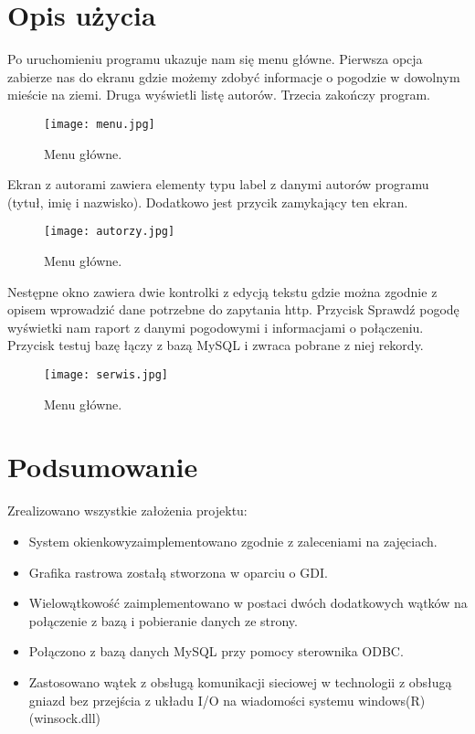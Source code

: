 \documentclass[a4paper,twoside,12pt]{mgr}
\begin{document}
\chapter{Opis użycia}
Po uruchomieniu programu ukazuje nam się menu główne. Pierwsza opcja zabierze nas do ekranu gdzie możemy zdobyć informacje o pogodzie w dowolnym mieście na ziemi. Druga wyświetli listę autorów. Trzecia zakończy program.

\begin{figure}[H]
\centering
\texttt{[image: menu.jpg]}
\caption{Menu główne.}%
\label{rys:etykieta}
\end{figure} 
Ekran z autorami zawiera elementy typu label z danymi autorów programu (tytuł, imię i nazwisko). Dodatkowo jest przycik zamykający ten ekran.
\begin{figure}[H]
\centering
\texttt{[image: autorzy.jpg]}
\caption{Menu główne.}%
\label{rys:etykieta}
\end{figure} 
Nestępne okno zawiera dwie kontrolki z edycją tekstu gdzie można zgodnie z opisem wprowadzić dane potrzebne do zapytania http. Przycisk Sprawdź pogodę wyświetki nam raport z danymi pogodowymi i informacjami o połączeniu. Przycisk testuj bazę łączy z bazą MySQL i  zwraca pobrane z niej rekordy.
\begin{figure}[H]
\centering
\texttt{[image: serwis.jpg]}
\caption{Menu główne.}%
\label{rys:etykieta}
\end{figure} 
\chapter{Podsumowanie}
Zrealizowano wszystkie założenia projektu:
\begin{itemize}
\item System okienkowyzaimplementowano zgodnie z zaleceniami na zajęciach.
\item Grafika rastrowa zostałą stworzona w oparciu o GDI.
\item Wielowątkowość zaimplementowano w postaci dwóch dodatkowych wątków na połączenie z bazą i pobieranie danych ze strony.
\item Połączono z bazą danych MySQL przy pomocy sterownika ODBC.
\item Zastosowano wątek z obsługą komunikacji sieciowej w technologii z obsługą gniazd bez przejścia z układu I/O na wiadomości systemu windows(R) (winsock.dll)  
\end{itemize}
\end{document}
